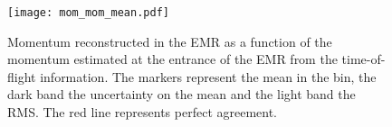 \begin{figure}[htb!]
	\begin{center}
		\texttt{[image: mom\_mom\_mean.pdf]}
		\caption{Momentum reconstructed in the EMR as a function of the momentum estimated at the entrance of the EMR from the time-of-flight information. The markers represent the mean in the bin, the dark band the uncertainty on the mean and the light band the RMS. The red line represents perfect agreement.}
		\label{fig:emr_momentum}
	\end{center}
\end{figure}


